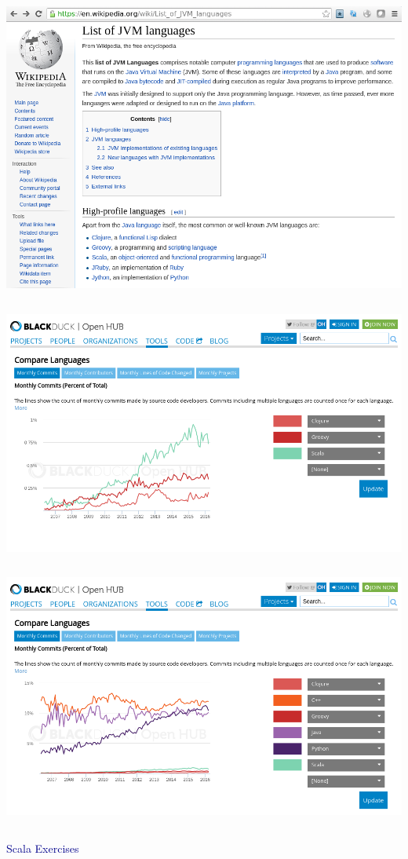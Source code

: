 \documentclass{beamer}
\begin{document}
\begin{frame}{}
\begin{columns}
\includegraphics[width=\linewidth]{jvm_languages.png}
\end{columns}
\end{frame}

\begin{frame}{}
\begin{columns}
\includegraphics[width=\linewidth]{popularity1.png}
\end{columns}
\end{frame}

\begin{frame}{}
\begin{columns}
\includegraphics[width=\linewidth]{popularity2.png}
\end{columns}
\end{frame}

\begin{frame}{}
\begin{center}
\Huge \textcolor{darkblue}{Scala Exercises}
\end{center}
\end{frame}
\end{document}
